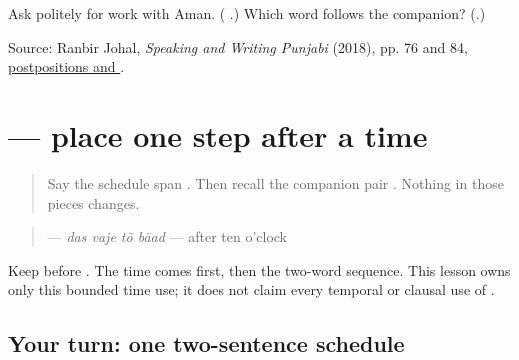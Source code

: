 \begin{tcolorbox}[breakable,colback=teal!4,colframe=teal!35!black,title={Before you move on}]
Ask politely for work with Aman. (\textbf{   }.) Which word follows the companion? (\textbf{}.)

Source: Ranbir Johal, \emph{Speaking and Writing Punjabi} (2018), pp. 76 and 84, \href{https://openlibrary-repo.ecampusontario.ca/jspui/bitstream/123456789/492/2/2018Pun1100CoursePackage.pdf}{postpositions and }.
\end{tcolorbox}
\section[\texorpdfstring{\pa{ਅਮਨ} \pa{ਨਾਲ} \pa{ਅੱਠ} \pa{ਵਜੇ} \pa{ਤੋਂ} … (Aman naal atth …)}{ਅਮਨ ਨਾਲ ਅੱਠ ਵਜੇ ਤੋਂ … (Aman naal atth …)}]{    — place one step after a time}

\label{lesson:PA-C178-baad}



\begin{quote}
Say the schedule span \textbf{     }. Then recall the companion pair \textbf{ }. Nothing in those pieces changes.
\end{quote}

\begin{grammarlens}[title={Grammar Lens: \pa{ਤੋਂ} \pa{ਬਾਅਦ} marks the later step}]
\begin{quote}
\textbf{   } — \emph{das vaje tõ bāad} — after ten o'clock
\end{quote}

Keep \textbf{} before \textbf{}. The time comes first, then the two-word sequence. This lesson owns only this bounded time use; it does not claim every temporal or clausal use of \textbf{}.
\end{grammarlens}

\subsection*{Your turn: one two-sentence schedule}
\begin{quote}
\textbf{               }
\end{quote}

